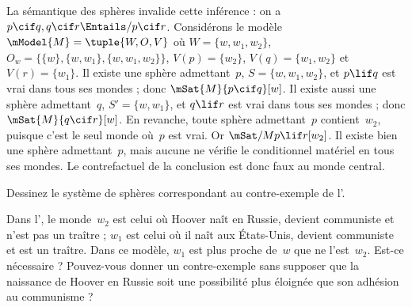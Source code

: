 \documentclass[../../../include/open-logic-section]{subfiles}
\begin{document}
\begin{ex}
  La sémantique des sphères invalide cette inférence : on a $p
  \cif q, q \cif r \Entails/ p \cif r$. Considérons le modèle
  $\mModel{M} = \tuple{W, O, V}$ où $W = \{w, w_1, w_2\}$,
  $O_w = \{\{w\}, \{w, w_1\}, \{w, w_1, w_2\}\}$,
  $V(p) = \{w_2\}$, $V(q) = \{w_1, w_2\}$ et
  $V(r) = \{w_1\}$. %
%
   Il existe une sphère admettant~$p$,
  $S = \{w, w_1, w_2\}$, et $p \lif q$ est vrai dans tous ses mondes ;
  donc $\mSat{M}{p \cif q}[w]$. Il existe aussi une sphère
  admettant~$q$, $S' = \{w, w_1\}$, et $q \lif r$ est vrai dans tous
  ses mondes ; donc $\mSat{M}{q \cif r}[w]$. En revanche, toute
  sphère admettant~$p$ contient~$w_2$, puisque c'est le seul monde
  où~$p$ est vrai. Or $\mSat/{M}{p \lif r}[w_2]$. Il existe
  bien une sphère admettant~$p$, mais aucune ne vérifie le
  conditionnel matériel en tous ses mondes. Le contrefactuel
  de la conclusion est donc faux au monde central.
\end{ex}

\begin{prob}
  Dessinez le système de sphères correspondant au contre-exemple de
  l'.
\end{prob}

\begin{prob}
  Dans l', le monde~$w_2$ est
  celui où Hoover naît en Russie, devient communiste et n'est pas un
  traître ; $w_1$ est celui où il naît aux États-Unis, devient
  communiste et est un traître. Dans ce modèle, $w_1$ est plus proche
  de~$w$ que ne l'est~$w_2$. Est-ce nécessaire ? Pouvez-vous donner
  un contre-exemple sans supposer que la naissance de Hoover en
  Russie soit une possibilité plus éloignée que son adhésion au
  communisme ?
\end{prob}
\end{document}
